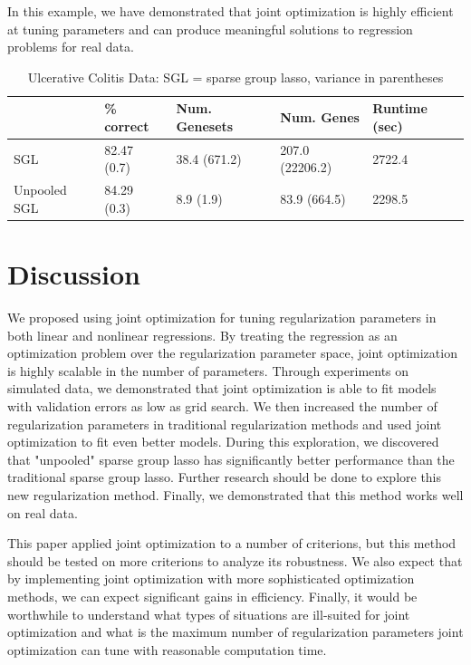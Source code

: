 \documentclass[10pt,letterpaper]{article}
\begin{document}
In this example, we have demonstrated that joint optimization is highly efficient at tuning parameters and can produce meaningful solutions to regression problems for real data.

\begin{table}
\begin{center}
\begin{tabular}{| l | l | l | l | l | }
\hline
 & \% correct  & Num. Genesets & Num. Genes & Runtime (sec) \\
\hline
SGL & 82.47 (0.7) & 38.4 (671.2) & 207.0 (22206.2) & 2722.4 \\
\hline
Unpooled SGL & 84.29 (0.3) & 8.9 (1.9) & 83.9 (664.5) & 2298.5 \\
\hline
\end{tabular}
\end{center}
\caption {Ulcerative Colitis Data: SGL = sparse group lasso, variance in parentheses}
\label{colitis}
\end{table}

\section{Discussion}
We proposed using joint optimization for tuning regularization parameters in both linear and nonlinear regressions. By treating the regression as an optimization problem over the regularization parameter space, joint optimization is highly scalable in the number of parameters. Through experiments on simulated data, we demonstrated that joint optimization is able to fit models with validation errors as low as grid search. We then increased the number of regularization parameters in traditional regularization methods and used joint optimization to fit even better models. During this exploration, we discovered that "unpooled" sparse group lasso has significantly better performance than the traditional sparse group lasso. Further research should be done to explore this new regularization method. Finally, we demonstrated that this method works well on real data.

This paper applied joint optimization to a number of criterions, but this method should be tested on more criterions to analyze its robustness. We also expect that by implementing joint optimization with more sophisticated optimization methods, we can expect significant gains in efficiency. Finally, it would be worthwhile to understand what types of situations are ill-suited for joint optimization and what is the maximum number of regularization parameters joint optimization can tune with reasonable computation time.
\end{document}
